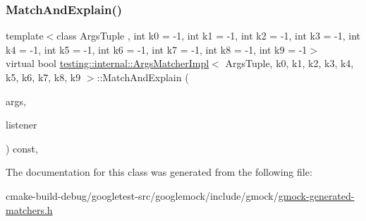\subsubsection{\texorpdfstring{MatchAndExplain()}{MatchAndExplain()}}
{\footnotesize\ttfamily template$<$class Args\+Tuple , int k0 = -\/1, int k1 = -\/1, int k2 = -\/1, int k3 = -\/1, int k4 = -\/1, int k5 = -\/1, int k6 = -\/1, int k7 = -\/1, int k8 = -\/1, int k9 = -\/1$>$ \\
virtual bool \mbox{\hyperlink{classtesting_1_1internal_1_1ArgsMatcherImpl}{testing\+::internal\+::\+Args\+Matcher\+Impl}}$<$ Args\+Tuple, k0, k1, k2, k3, k4, k5, k6, k7, k8, k9 $>$\+::Match\+And\+Explain (\begin{DoxyParamCaption}\item[{Args\+Tuple}]{args,  }\item[{Match\+Result\+Listener $\ast$}]{listener }\end{DoxyParamCaption}) const\hspace{0.3cm}{\ttfamily [inline]}, {\ttfamily [virtual]}}



The documentation for this class was generated from the following file\+:\begin{DoxyCompactItemize}
\item 
cmake-\/build-\/debug/googletest-\/src/googlemock/include/gmock/\mbox{\hyperlink{gmock-generated-matchers_8h}{gmock-\/generated-\/matchers.\+h}}\end{DoxyCompactItemize}
